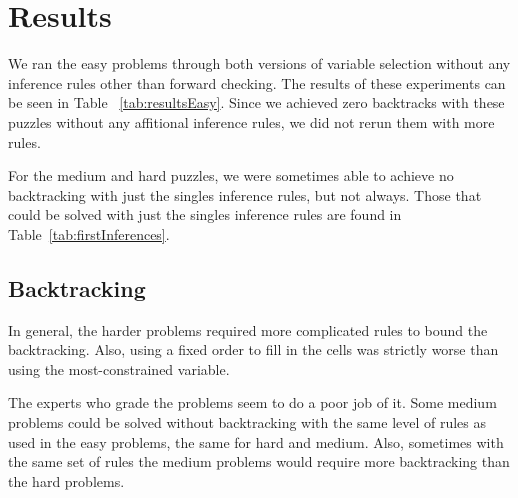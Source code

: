 \documentclass{article}
\begin{document}
\section{Results}
We ran the easy problems through both versions of variable selection without any inference rules other than forward checking. The results of these experiments can be seen in Table ~\ref{tab:resultsEasy}. Since we achieved zero backtracks with these puzzles without any affitional inference rules, we did not rerun them with more rules.

For the medium and hard puzzles, we were sometimes able to achieve no backtracking with just the singles inference rules, but not always. Those that could be solved with just the singles inference rules are found in Table~\ref{tab:firstInferences}.
\subsection{Backtracking}
In general, the harder problems required more complicated rules to bound the backtracking. Also, using a fixed order to fill in the cells was strictly worse than using the most-constrained variable.

The experts who grade the problems seem to do a poor job of it. Some medium problems could be solved without backtracking with the same level of rules as used in the easy problems, the same for hard and medium. Also, sometimes with the same set of rules the medium problems would require more backtracking than the hard problems.
\end{document}
